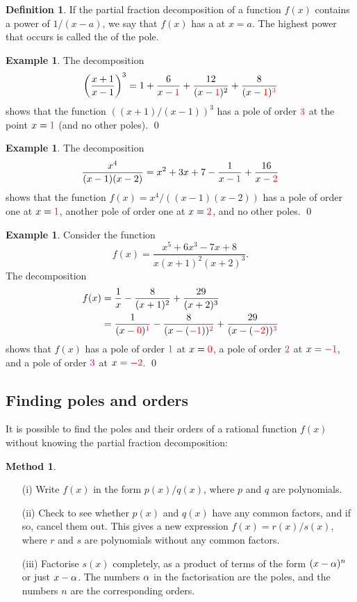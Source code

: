 \documentclass[a4paper]{book}
\theoremstyle{definition}
\newtheorem{definition}[theorem]{Definition}
\newtheorem{example}[theorem]{Example}
\newtheorem{method}[theorem]{Method}
\begin{document}
\begin{definition}
 If the partial fraction decomposition of a function $f(x)$ contains a
 power of $1/(x-a)$, we say that $f(x)$ has a  at $x=a$.
 The highest power that occurs is called the  of the pole.
\end{definition}
\begin{example}
 The decomposition
 \[ \left(\frac{x+1}{x-1}\right)^3
    = 1 + \frac{6}{x-{\color{red}1}} +
      \frac{12}{(x-{\color{red}1})^2} + \frac{8}{(x-{\color{red}1})^{\color{magenta}3}}
 \]
 shows that the function $((x+1)/(x-1))^3$ has a pole of order
 ${\color{magenta}3}$ at the point $x={\color{red}1}$ (and no other poles). \qed
\end{example}
\begin{example}
 The decomposition
 \[ \frac{x^4}{(x-1)(x-2)}
    = x^2 + 3x + 7 - \frac{1}{x-{\color{red}1}} + \frac{16}{x-{\color{red}2}}
 \]
 shows that the function $f(x)=x^4/((x-1)(x-2))$ has a pole of order
 one at $x={\color{red}1}$, another pole of order one at $x={\color{red}2}$, and no
 other poles. \qed
\end{example}
\begin{example}
 Consider the function
 \[ f(x) = \frac{x^5+6x^3-7x+8}{x(x+1)^2(x+2)^3}. \]
 The decomposition
 \begin{align*}
  f(x) &= \frac{1}{x} - \frac{8}{(x+1)^2} + \frac{29}{(x+2)^3} \\
       &=   \frac{ 1}{(x-{\color{red}0})^{\color{magenta}1}}
          - \frac{ 8}{(x-({\color{red}-1}))^{\color{magenta}2}}
          + \frac{29}{(x-({\color{red}-2}))^{\color{magenta}3}}
 \end{align*}
 shows that $f(x)$ has a pole of order ${\color{magenta}1}$ at $x={\color{red}0}$,
 a pole of order ${\color{magenta}2}$ at $x={\color{red}-1}$, and a pole of order
 ${\color{magenta}3}$ at $x={\color{red}-2}$. \qed
\end{example}

\subsection*{Finding poles and orders}

It is possible to find the poles and their orders of a rational
function $f(x)$ without knowing the partial fraction decomposition:
\begin{method}
 \begin{itemize}
  \item[(i)] Write $f(x)$ in the form $p(x)/q(x)$, where $p$ and $q$
   are polynomials.
  \item[(ii)] Check to see whether $p(x)$ and $q(x)$ have any common
   factors, and if so, cancel them out.  This gives a new expression
   $f(x)=r(x)/s(x)$, where $r$ and $s$ are polynomials without any
   common factors.
  \item[(iii)] Factorise $s(x)$ completely, as a product of terms of
   the form $(x-\alpha)^n$ or just $x-\alpha$.  The numbers $\alpha$ in the
   factorisation are the poles, and the numbers $n$ are the
   corresponding orders.
 \end{itemize}
\end{method}
\end{document}
